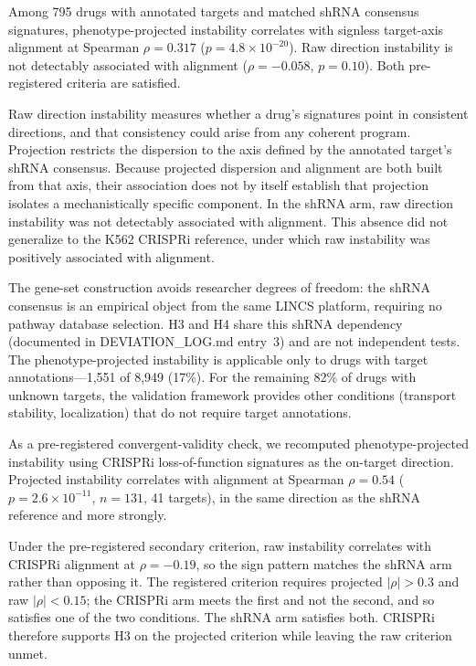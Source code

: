 \documentclass[11pt]{article}
\begin{document}
Among 795 drugs with annotated targets and matched shRNA consensus signatures,
phenotype-projected instability correlates with signless target-axis alignment at
Spearman $\rho = 0.317$ ($p = 4.8 \times 10^{-20}$). Raw direction instability is
not detectably associated with alignment ($\rho = -0.058$, $p = 0.10$). Both
pre-registered criteria are satisfied.

Raw direction instability measures whether a drug's signatures point in
consistent directions, and that consistency could arise from any coherent
program. Projection restricts the dispersion to the axis defined by the
annotated target's shRNA consensus. Because projected dispersion and alignment
are both built from that axis, their association does not by itself establish
that projection isolates a mechanistically specific component. In the shRNA arm,
raw direction instability was not detectably associated with alignment. This
absence did not generalize to the K562 CRISPRi reference, under which raw
instability was positively associated with alignment.

The gene-set construction avoids researcher degrees of freedom: the shRNA
consensus is an empirical object from the same LINCS platform,
requiring no pathway database selection. H3 and H4 share this shRNA
dependency (documented in DEVIATION\_LOG.md entry~3) and are not
independent tests. The phenotype-projected instability is applicable only
to drugs with target annotations---1{,}551 of 8{,}949 (17\%). For the
remaining 82\% of drugs with unknown targets, the validation framework
provides other conditions (transport stability, localization) that do not
require target annotations.

As a pre-registered convergent-validity check, we recomputed
phenotype-projected instability using CRISPRi loss-of-function signatures
\citep{replogle2022mapping} as the on-target direction. Projected
instability correlates with alignment at Spearman $\rho = 0.54$
($p = 2.6 \times 10^{-11}$, $n = 131$, 41 targets), in the same direction
as the shRNA reference and more strongly.

Under the pre-registered secondary criterion, raw instability correlates
with CRISPRi alignment at $\rho = -0.19$, so the sign pattern matches the
shRNA arm rather than opposing it. The registered criterion requires
projected $|\rho| > 0.3$ and raw $|\rho| < 0.15$; the CRISPRi arm meets
the first and not the second, and so satisfies one of the two conditions.
The shRNA arm satisfies both. CRISPRi therefore supports H3 on the projected
criterion while leaving the raw criterion unmet.
\end{document}
